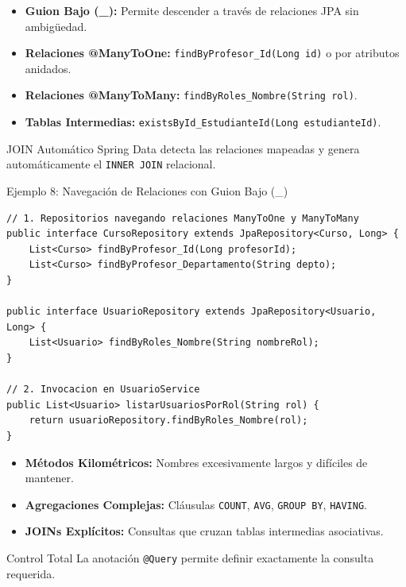 \documentclass[aspectratio=169]{beamer}
\begin{document}
  {
    \begin{itemize}
      \item \textbf{Guion Bajo (\_):} Permite descender a trav\'es de relaciones JPA sin ambig\"uedad.
      \item \textbf{Relaciones @ManyToOne:} \texttt{findByProfesor\_Id(Long id)} o por atributos anidados.
      \item \textbf{Relaciones @ManyToMany:} \texttt{findByRoles\_Nombre(String rol)}.
      \item \textbf{Tablas Intermedias:} \texttt{existsById\_EstudianteId(Long estudianteId)}.
    \end{itemize}
  }
  {JOIN Autom\'atico}
  {Spring Data detecta las relaciones mapeadas y genera autom\'aticamente el \texttt{INNER JOIN} relacional.}

\begin{frame}[fragile]{Ejemplo 8: Navegaci\'on de Relaciones con Guion Bajo (\_)}
\begin{lstlisting}[style=SpringCodeStyle]
// 1. Repositorios navegando relaciones ManyToOne y ManyToMany
public interface CursoRepository extends JpaRepository<Curso, Long> {
    List<Curso> findByProfesor_Id(Long profesorId);
    List<Curso> findByProfesor_Departamento(String depto);
}

public interface UsuarioRepository extends JpaRepository<Usuario, Long> {
    List<Usuario> findByRoles_Nombre(String nombreRol);
}

// 2. Invocacion en UsuarioService
public List<Usuario> listarUsuariosPorRol(String rol) {
    return usuarioRepository.findByRoles_Nombre(rol);
}
\end{lstlisting}
\end{frame}



  {
    \begin{itemize}
      \item \textbf{M\'etodos Kilom\'etricos:} Nombres excesivamente largos y dif\'iciles de mantener.
      \item \textbf{Agregaciones Complejas:} Cl\'ausulas \texttt{COUNT}, \texttt{AVG}, \texttt{GROUP BY}, \texttt{HAVING}.
      \item \textbf{JOINs Expl\'icitos:} Consultas que cruzan tablas intermedias asociativas.
    \end{itemize}
  }
  {Control Total}
  {La anotaci\'on \texttt{@Query} permite definir exactamente la consulta requerida.}
\end{document}
